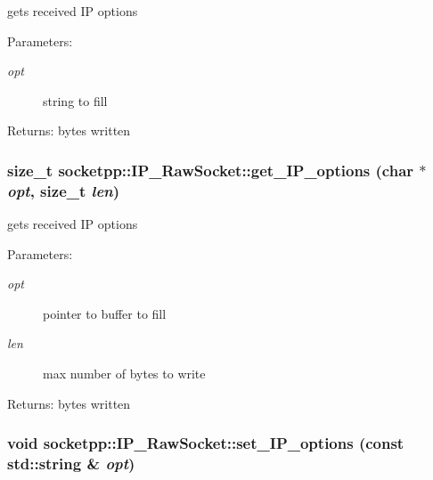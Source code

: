 gets received IP options 

\begin{Desc}
\item[Parameters:]
\begin{description}
\item[{\em opt}]string to fill \end{description}
\end{Desc}
\begin{Desc}
\item[Returns:]bytes written \end{Desc}
\hypertarget{classsocketpp_1_1IP__RawSocket_686fcc72997b0843b2ece0c4d8a5735d}{
\subsubsection[{get\_\-IP\_\-options}]{\setlength{\rightskip}{0pt plus 5cm}size\_\-t socketpp::IP\_\-RawSocket::get\_\-IP\_\-options (char $\ast$ {\em opt}, \/  size\_\-t {\em len})}}
\label{classsocketpp_1_1IP__RawSocket_686fcc72997b0843b2ece0c4d8a5735d}


gets received IP options 

\begin{Desc}
\item[Parameters:]
\begin{description}
\item[{\em opt}]pointer to buffer to fill \item[{\em len}]max number of bytes to write \end{description}
\end{Desc}
\begin{Desc}
\item[Returns:]bytes written \end{Desc}
\hypertarget{classsocketpp_1_1IP__RawSocket_9d88ecec5e362b3cf3d3dbc51d5dd0cd}{
\subsubsection[{set\_\-IP\_\-options}]{\setlength{\rightskip}{0pt plus 5cm}void socketpp::IP\_\-RawSocket::set\_\-IP\_\-options (const std::string \& {\em opt})}}
\label{classsocketpp_1_1IP__RawSocket_9d88ecec5e362b3cf3d3dbc51d5dd0cd}


